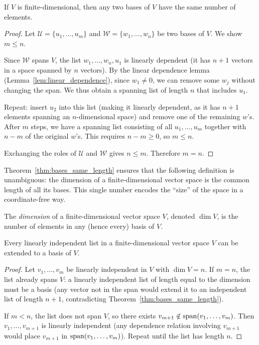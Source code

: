 \documentclass[11pt,a4paper]{article}
\begin{document}
\begin{theorem}
\label{thm:bases_same_length}
If $V$ is finite-dimensional, then any two bases of $V$ have the same number
of elements.
\end{theorem}

\begin{proof}
Let $\mathcal{U} = \{u_1, \ldots, u_m\}$ and $\mathcal{W} = \{w_1, \ldots, w_n\}$
be two bases of $V$.  We show $m \leq n$.

Since $\mathcal{W}$ spans $V$, the list $w_1, \ldots, w_n, u_1$ is linearly
dependent (it has $n+1$ vectors in a space spanned by $n$ vectors).
By the linear dependence lemma (Lemma~\ref{lem:linear_dependence}), since
$w_1 \neq 0$, we can remove some $w_j$ without changing the span.  We thus
obtain a spanning list of length $n$ that includes $u_1$.

Repeat: insert $u_2$ into this list (making it linearly dependent, as it has
$n+1$ elements spanning an $n$-dimensional space) and remove one of the
remaining $w$'s.  After $m$ steps, we have a spanning list consisting of all
$u_1, \ldots, u_m$ together with $n - m$ of the original $w$'s.  This requires
$n - m \geq 0$, so $m \leq n$.

Exchanging the roles of $\mathcal{U}$ and $\mathcal{W}$ gives $n \leq m$.
Therefore $m = n$.
\end{proof}

\begin{keyresult}[title={Dimension Is Well-Defined}]
Theorem~\ref{thm:bases_same_length} ensures that the following definition is
unambiguous: the dimension of a finite-dimensional vector space is the common
length of all its bases.  This single number encodes the ``size'' of the space
in a coordinate-free way.
\end{keyresult}

\begin{definition}[Dimension]
\label{def:dimension}
The \emph{dimension} of a finite-dimensional vector space $V$, denoted
$\dim V$, is the number of elements in any (hence every) basis of $V$.
\end{definition}

\begin{proposition}
\label{prop:basis_extension}
Every linearly independent list in a finite-dimensional vector space $V$ can be
extended to a basis of $V$.
\end{proposition}

\begin{proof}
Let $v_1, \ldots, v_m$ be linearly independent in $V$ with $\dim V = n$.
If $m = n$, the list already spans $V$: a linearly independent list of length
equal to the dimension must be a basis (any vector not in the span would extend
it to an independent list of length $n+1$, contradicting
Theorem~\ref{thm:bases_same_length}).

If $m < n$, the list does not span $V$, so there exists
$v_{m+1} \notin \operatorname{span}(v_1, \ldots, v_m)$.  Then $v_1, \ldots, v_{m+1}$ is
linearly independent (any dependence relation involving $v_{m+1}$ would place
$v_{m+1}$ in $\operatorname{span}(v_1, \ldots, v_m)$).  Repeat until the list has length $n$.
\end{proof}
\end{document}

